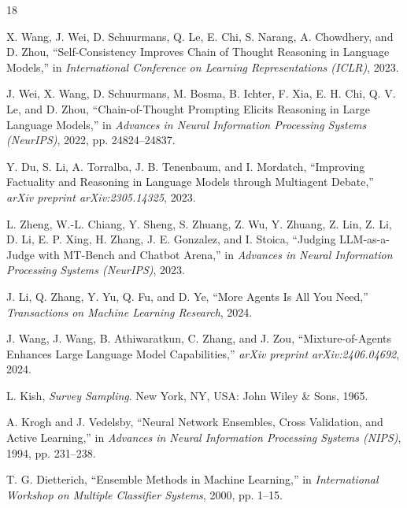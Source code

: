 \documentclass[conference]{IEEEtran}
\begin{document}
\begin{thebibliography}{18}

X. Wang, J. Wei, D. Schuurmans, Q. Le, E. Chi, S. Narang, A. Chowdhery, and D. Zhou, ``Self-Consistency Improves Chain of Thought Reasoning in Language Models,'' in \emph{International Conference on Learning Representations (ICLR)}, 2023.

J. Wei, X. Wang, D. Schuurmans, M. Bosma, B. Ichter, F. Xia, E. H. Chi, Q. V. Le, and D. Zhou, ``Chain-of-Thought Prompting Elicits Reasoning in Large Language Models,'' in \emph{Advances in Neural Information Processing Systems (NeurIPS)}, 2022, pp. 24824--24837.

Y. Du, S. Li, A. Torralba, J. B. Tenenbaum, and I. Mordatch, ``Improving Factuality and Reasoning in Language Models through Multiagent Debate,'' \emph{arXiv preprint arXiv:2305.14325}, 2023.

L. Zheng, W.-L. Chiang, Y. Sheng, S. Zhuang, Z. Wu, Y. Zhuang, Z. Lin, Z. Li, D. Li, E. P. Xing, H. Zhang, J. E. Gonzalez, and I. Stoica, ``Judging LLM-as-a-Judge with MT-Bench and Chatbot Arena,'' in \emph{Advances in Neural Information Processing Systems (NeurIPS)}, 2023.

J. Li, Q. Zhang, Y. Yu, Q. Fu, and D. Ye, ``More Agents Is All You Need,'' \emph{Transactions on Machine Learning Research}, 2024.

J. Wang, J. Wang, B. Athiwaratkun, C. Zhang, and J. Zou, ``Mixture-of-Agents Enhances Large Language Model Capabilities,'' \emph{arXiv preprint arXiv:2406.04692}, 2024.

L. Kish, \emph{Survey Sampling}. New York, NY, USA: John Wiley \& Sons, 1965.

A. Krogh and J. Vedelsby, ``Neural Network Ensembles, Cross Validation, and Active Learning,'' in \emph{Advances in Neural Information Processing Systems (NIPS)}, 1994, pp. 231--238.

T. G. Dietterich, ``Ensemble Methods in Machine Learning,'' in \emph{International Workshop on Multiple Classifier Systems}, 2000, pp. 1--15.


\end{thebibliography}
\end{document}
